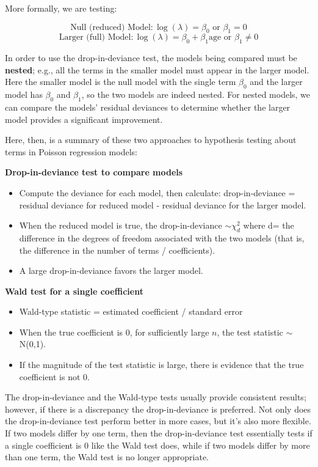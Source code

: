 \documentclass[
]{krantz}
\providecommand{\tightlist}{%
  \setlength{\itemsep}{0pt}\setlength{\parskip}{0pt}}
\begin{document}
More formally, we are testing:

\[\textrm{Null (reduced) Model}: \log(\lambda) = \beta_0 \textrm{ or } \beta_1=0\]
\[\textrm{Larger (full) Model}: \log(\lambda) = \beta_0 + \beta_1\textrm{age} \textrm{ or } \beta_1 \neq 0 \]

In order to use the drop-in-deviance test, the models being compared must be \textbf{nested};  e.g., all the terms in the smaller model must appear in the larger model. Here the smaller model is the null model with the single term \(\beta_0\) and the larger model has \(\beta_0\) and \(\beta_1\), so the two models are indeed nested. For nested models, we can compare the models' residual deviances to determine whether the larger model provides a significant improvement.

Here, then, is a summary of these two approaches to hypothesis testing about terms in Poisson regression models:

\textbf{Drop-in-deviance test to compare models} 

\begin{itemize}
\tightlist
\item
  Compute the deviance for each model, then calculate: drop-in-deviance = residual deviance for reduced model - residual deviance for the larger model.
\item
  When the reduced model is true, the drop-in-deviance \(\sim \chi^2_d\)
  where d= the difference in the degrees of freedom associated with the two models (that is, the difference in the number of terms / coefficients).
\item
  A large drop-in-deviance favors the larger model.
\end{itemize}

\textbf{Wald test for a single coefficient} 

\begin{itemize}
\tightlist
\item
  Wald-type statistic = estimated coefficient / standard error
\item
  When the true coefficient is 0, for sufficiently large \(n\), the test statistic \(\sim\) N(0,1).
\item
  If the magnitude of the test statistic is large, there is evidence that the true coefficient is not 0.
\end{itemize}

The drop-in-deviance and the Wald-type tests usually provide consistent results; however, if there is a discrepancy the drop-in-deviance is preferred. Not only does the drop-in-deviance test perform better in more cases, but it's also more flexible. If two models differ by one term, then the drop-in-deviance test essentially tests if a single coefficient is 0 like the Wald test does, while if two models differ by more than one term, the Wald test is no longer appropriate.
\end{document}
